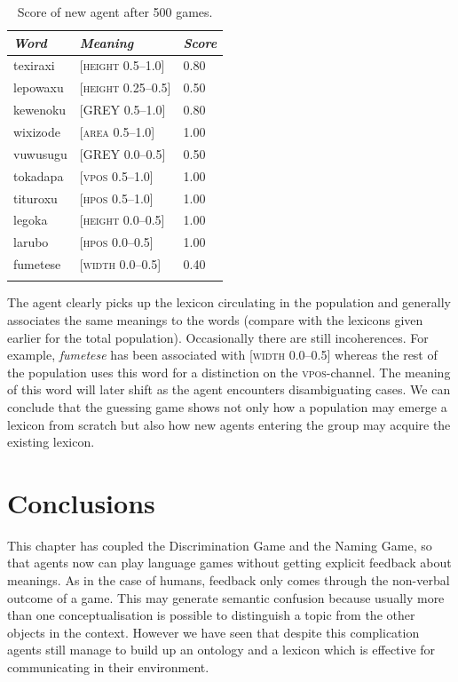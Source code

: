 \begin{table}
\begin{center}
\begin{tabular}{ l  l  l }
\lsptoprule
{\itshape Word} & {\itshape Meaning} & {\itshape Score} \\ \midrule
texiraxi &  [\textsc{height} 0.5–1.0] & 0.80 \\ 
lepowaxu &  [\textsc{height} 0.25–0.5] & 0.50 \\ 
kewenoku &  [GREY 0.5–1.0] & 0.80 \\ 
wixizode & [\textsc{area} 0.5–1.0] & 1.00 \\ 
vuwusugu & [GREY 0.0–0.5] & 0.50 \\ 
tokadapa &  [\textsc{vpos} 0.5–1.0] & 1.00 \\ 
tituroxu &  [\textsc{hpos} 0.5–1.0] & 1.00 \\ 
legoka   &  [\textsc{height} 0.0–0.5] & 1.00 \\ 
larubo   &  [\textsc{hpos} 0.0–0.5] & 1.00 \\ 
fumetese &  [\textsc{width} 0.0–0.5] & 0.40 \\ 
\lspbottomrule
\end{tabular}
\caption{\label{tab:newagents}Score of new agent after 500 games.}
\end{center}
\end{table}
The agent clearly picks up the lexicon circulating
in the population and generally associates the 
same meanings to the words (compare with the 
lexicons given earlier for the total population). 
Occasionally there are still incoherences. For example, 
\textit{fumetese} has been associated with [\textsc{width} 0.0–0.5] 
whereas the rest of the population uses this word
for a distinction on the \textsc{vpos}-channel. The meaning
of this word will later shift as the agent encounters
disambiguating cases. We can conclude that the 
guessing game shows not only how a population may 
emerge a lexicon from scratch but also how new 
agents entering the group may acquire the existing 
lexicon.  

\section{Conclusions}

This chapter has coupled the Discrimination Game and 
the Naming Game, so that agents now can play language
games without getting explicit feedback about meanings. 
As in the case of humans, feedback only comes through 
the non-verbal outcome of a game. 
This may generate semantic confusion
because usually more than one conceptualisation is 
possible to distinguish a topic from the other objects
in the context. However we have seen that despite
this complication agents still manage to build up 
an ontology and a lexicon which is effective for 
communicating in their environment. 

